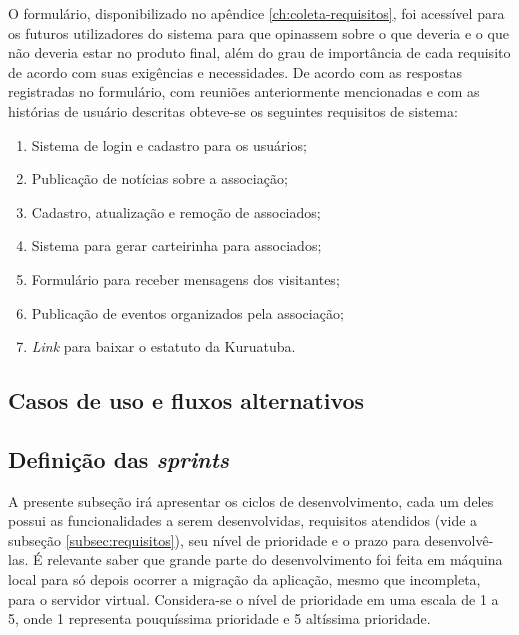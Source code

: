 O formulário, disponibilizado no apêndice \ref{ch:coleta-requisitos}, foi acessível para os futuros utilizadores do sistema para que opinassem sobre o que deveria e o que não deveria estar no produto final, além do grau de importância de cada requisito de acordo com suas exigências e necessidades. De acordo com as respostas registradas no formulário, com reuniões anteriormente mencionadas e com as histórias de usuário descritas obteve-se os seguintes requisitos de sistema:

\begin{enumerate}
 \item Sistema de login e cadastro para os usuários;
 \item Publicação de notícias sobre a associação;
 \item Cadastro, atualização e remoção de associados;
 \item Sistema para gerar carteirinha para associados;
 \item Formulário para receber mensagens dos visitantes;
 \item Publicação de eventos organizados pela associação;
 \item \textit{Link} para baixar o estatuto da Kuruatuba.
\end{enumerate}


\hspace{2.5cm}
\subsection{Casos de uso e fluxos alternativos}
\label{subsec:usecase}
\hspace{2.5cm}

\hspace{2.5cm}
\subsection{Definição das \textit{sprints}}
\label{subsec:sprints}
\hspace{2.5cm}

A presente subseção irá apresentar os ciclos de desenvolvimento, cada um deles possui as funcionalidades a serem desenvolvidas, requisitos atendidos (vide a subseção \ref{subsec:requisitos}), seu nível de prioridade e o prazo para desenvolvê-las. É relevante saber que grande parte do desenvolvimento foi feita em máquina local para só depois ocorrer a migração da aplicação, mesmo que incompleta, para o servidor virtual. Considera-se o nível de prioridade em uma escala de 1 a 5, onde 1 representa pouquíssima prioridade e 5 altíssima prioridade. 

